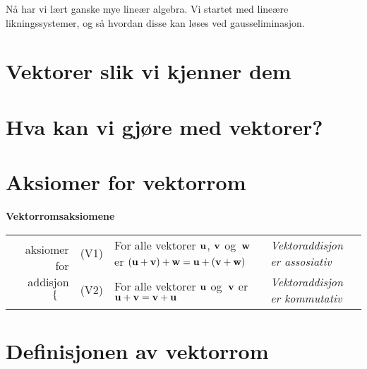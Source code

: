 

\label{ch:vektorrom}



Nå har vi lært ganske mye lineær algebra.  Vi startet med lineære
likningssystemer, og så hvordan disse kan løses ved gausseliminasjon.


\section*{Vektorer slik vi kjenner dem}


\section*{Hva kan vi gjøre med vektorer?}


\section*{Aksiomer for vektorrom}


\onecolumn %
\begin{center}
\textbf{Vektorromsaksiomene}

\begin{tabular}{rlll}
\multirow{4}{*}{aksiomer for addisjon $\left\{\rule{10pt}{0pt}\right.$} &
  (V1) & For alle vektorer $\mathbf{u}$, $\mathbf{v}$ og~$\mathbf{w}$ er $(\mathbf{u} + \mathbf{v}) + \mathbf{w} = \mathbf{u} + (\mathbf{v} + \mathbf{w})$
       & \emph{Vektoraddisjon er assosiativ} \\
& (V2) & For alle vektorer $\mathbf{u}$ og~$\mathbf{v}$ er $\mathbf{u} + \mathbf{v} = \mathbf{v} + \mathbf{u}$
       & \emph{Vektoraddisjon er kommutativ} \\
\end{tabular}
\end{center}
\twocolumn

\section*{Definisjonen av vektorrom}


